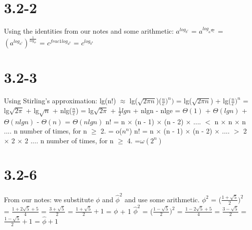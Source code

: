 \documentclass[12pt]{article}
\newcommand\tab[1][1cm]{\hspace*{#1}}
\begin{document}
\section{3.2-2}
Using the identities from our notes and some arithmetic: \newline
$a^{log_{b^c}}$ = $a^{log_{a^{\frac{c}{log_{a^b}}}}}$ \newline
\tab = $(a^{log_{a^c}})^{\frac{1}{log_{a^b}}}$ \newline 
\tab = $c^{frac{1}{log_{a^b}}}$ \newline
\tab = $c^{log_{b^a}}$ 

\section{3.2-3}
Using Stirling's approximation: \newline \newline
lg(n!) $\approx$ lg($\sqrt{2\pi n}$)($\frac{n}{e})^n)$ \newline
\tab = lg($\sqrt{2\pi n}$) + lg($\frac{n}{e})^n$ \newline
\tab = lg$\sqrt{2\pi}$ + lg$\sqrt{n}$ + nlg($\frac{n}{e}$) \newline
\tab = lg$\sqrt{2\pi}$ + $\frac{1}{2}lgn$ + nlgn - nlge \newline
\tab = $\Theta(1)$ + $\Theta(lgn)$ + $\Theta(nlgn)$ - $\Theta(n)$ \newline
\tab = $\Theta(nlgn)$ \newline \newline
n! = n $\times$ (n - 1) $\times$ (n - 2) $\times$ .... $<$ n $\times$ n $\times$ n .... n number of times, for n $\geq$ 2. \newline 
= o($n^n$) \newline \newline 
n! = n $\times$ (n - 1) $\times$ (n - 2) $\times$ .... $>$ 2 $\times$ 2 $\times$ 2 .... n number of times, for n $\geq$ 4. \newline
=$\omega(2^n)$ 

\section{3.2-6}
From our notes: we substitute $\phi$ and $\hat{\phi}^2$ and use some arithmetic.  \newline \newline
$\phi^2$ = ($\frac{1+\sqrt{5}}{2})^2$ \newline
= $\frac{1+2\sqrt{5}+5}{4}$ \newline
= $\frac{3+\sqrt{5}}{2}$ \newline
= $\frac{1+\sqrt{5}}{2}+1$ \newline
= $\phi$ + 1 \newline \newline
$\hat{\phi}^2$ = ($\frac{1-\sqrt{5}}{2})^2$ \newline
= $\frac{1-2\sqrt{5}+5}{4}$ \newline
= $\frac{3-\sqrt{5}}{2}$ \newline
= $\frac{1-\sqrt{5}}{2}+1$ \newline
= $\hat{\phi} + 1$
\end{document}
